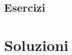 \documentclass[oneside]{scrbook}
\begin{document}
\subsection{Esercizi}






%








%

\clearpage
\section*{Soluzioni}
\shipoutAnswer
\end{document}
